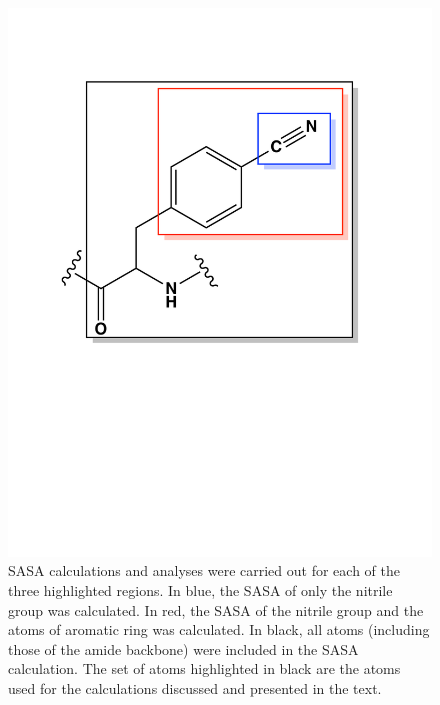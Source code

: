 \begin{figure}
    \center
    \includegraphics[width=\single]{figures-gfp-hbond/sasa_regions_aromatic.pdf}
    \caption{
        SASA calculations and analyses were carried out for each of the three highlighted regions. 
        In blue, the SASA of only the nitrile group was calculated. 
        In red, the SASA of the nitrile group and the atoms of aromatic ring was calculated. 
        In black, all atoms (including those of the amide backbone) were included in the SASA calculation. 
        The set of atoms highlighted in black are the atoms used for the calculations discussed and presented in the text.
    }
    \label{fig:hbond-sasa_regions}
\end{figure}

